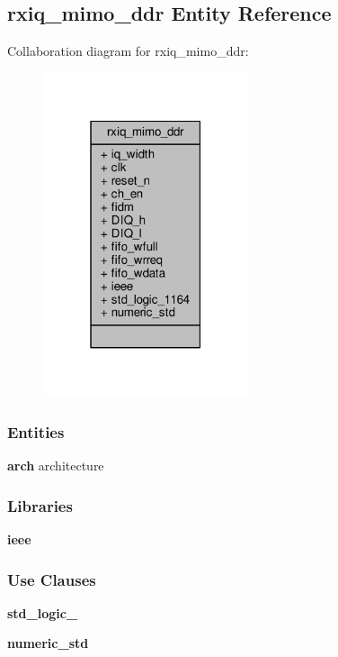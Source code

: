 \subsection{rxiq\+\_\+mimo\+\_\+ddr Entity Reference}
\label{classrxiq__mimo__ddr}


Collaboration diagram for rxiq\+\_\+mimo\+\_\+ddr\+:\nopagebreak
\begin{figure}[H]
\begin{center}
\leavevmode
\includegraphics[width=171pt]{d0/d47/classrxiq__mimo__ddr__coll__graph}
\end{center}
\end{figure}
\subsubsection*{Entities}
\begin{DoxyCompactItemize}
\item 
{\bf arch} architecture
\end{DoxyCompactItemize}
\subsubsection*{Libraries}
 \begin{DoxyCompactItemize}
\item 
{\bf ieee} 
\end{DoxyCompactItemize}
\subsubsection*{Use Clauses}
 \begin{DoxyCompactItemize}
\item 
{\bf std\+\_\+logic\+\_}   
\item 
{\bf numeric\+\_\+std}   
\end{DoxyCompactItemize}
